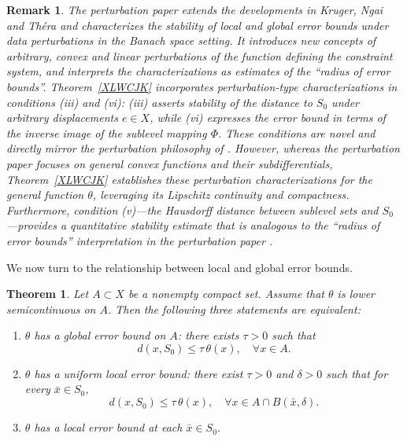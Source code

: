 \documentclass[11pt]{article}
\newtheorem{theorem}{Theorem}[section]
\newtheorem{remark}{Remark}[section]
\begin{document}
\begin{remark}
	The perturbation paper \cite{KLT2018} extends the developments in Kruger, Ngai and Th\'era      \cite{KNT2010} and characterizes the stability of local and global error bounds under data perturbations in the Banach space setting. It introduces new concepts of arbitrary, convex and linear perturbations of the function defining the constraint system, and interprets the characterizations as estimates of the ``radius of error bounds''. 	Theorem~\ref{XLWCJK} incorporates perturbation-type characterizations in conditions (iii) and (vi): (iii) asserts stability of the distance to \(S_0\) under arbitrary displacements \(e\in X\), while (vi) expresses the error bound in terms of the inverse image of the sublevel mapping \(\Phi\). These conditions are novel  and directly mirror the perturbation philosophy of  \cite{KLT2018}. However, whereas the perturbation paper focuses on general convex functions and their subdifferentials, Theorem~\ref{XLWCJK} establishes these perturbation characterizations for the general function  $\theta$, leveraging its Lipschitz continuity and compactness. Furthermore, condition (v)---the Hausdorff distance between sublevel sets and \(S_0\)---provides a quantitative stability estimate that is analogous to the ``radius of error bounds'' interpretation in the perturbation paper \cite{KLT2018}.
\end{remark}










We now turn to the relationship between local and global error bounds.


\begin{theorem} 
	\label{thm:localglobal}
	Let $A\subset X$ be a nonempty  compact  set.  Assume that $\theta$ is lower semicontinuous on $A$. 
	Then the following three statements are equivalent:
	\begin{enumerate}
		\item[(i)]  $\theta$ has a global error bound  on $A$: there exists  $\tau>0$ such that
		\[
		d(x,S_0)\le \tau\,\theta(x),\quad \forall x\in A .
		\]
		\item[(ii)]  $\theta$ has a uniform local error bound: there exist  $\tau>0$ and $\delta>0$ such that for  every $\bar x\in S_0$,
		$$	d(x, S_0)\le \tau\,\theta(x),\quad \forall x\in A\cap B(\bar x,\delta).	$$
		\item[(iii)] $\theta$ has a local error bound at each $\bar x\in S_0$.
	\end{enumerate}
\end{theorem}
\end{document}
